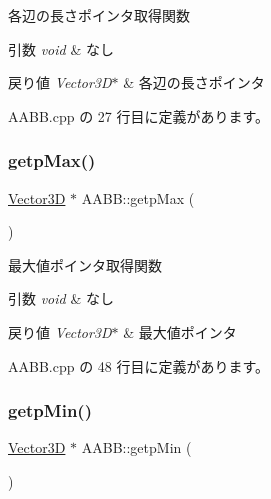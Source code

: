 各辺の長さポインタ取得関数 


\begin{DoxyParams}{引数}
{\em void} & なし \\
\hline
\end{DoxyParams}

\begin{DoxyRetVals}{戻り値}
{\em Vector3\+D$\ast$} & 各辺の長さポインタ \\
\hline
\end{DoxyRetVals}


 A\+A\+B\+B.\+cpp の 27 行目に定義があります。

\mbox{\label{class_a_a_b_b_aa7f199155cc3de141aba0bc25e6d9e68}} 
\subsubsection{\texorpdfstring{getp\+Max()}{getpMax()}}
{\footnotesize\ttfamily \mbox{\hyperlink{class_vector3_d}{Vector3D}} $\ast$ A\+A\+B\+B\+::getp\+Max (\begin{DoxyParamCaption}{ }\end{DoxyParamCaption})}



最大値ポインタ取得関数 


\begin{DoxyParams}{引数}
{\em void} & なし \\
\hline
\end{DoxyParams}

\begin{DoxyRetVals}{戻り値}
{\em Vector3\+D$\ast$} & 最大値ポインタ \\
\hline
\end{DoxyRetVals}


 A\+A\+B\+B.\+cpp の 48 行目に定義があります。

\mbox{\label{class_a_a_b_b_a3733a8d866acc126266c892a23abe39d}} 
\subsubsection{\texorpdfstring{getp\+Min()}{getpMin()}}
{\footnotesize\ttfamily \mbox{\hyperlink{class_vector3_d}{Vector3D}} $\ast$ A\+A\+B\+B\+::getp\+Min (\begin{DoxyParamCaption}{ }\end{DoxyParamCaption})}



